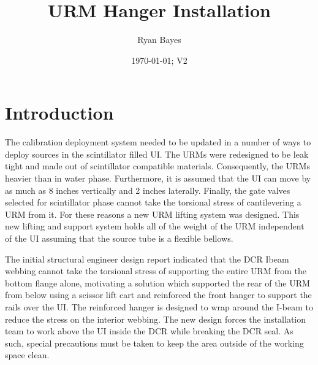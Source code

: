 \documentclass[11pt]{article}
\title{URM Hanger Installation}
\author{Ryan Bayes}
\date{\today; V2}
\begin{document}
\maketitle

\section{Introduction}
The calibration deployment system needed to be updated in a number of ways to deploy sources in the scintillator filled UI. The URMs were redesigned to be leak tight and made out of scintillator compatible materials. Consequently, the URMs heavier than in water phase. Furthermore, it is assumed that the UI can move by as much as 8 inches vertically and 2 inches laterally. Finally, the gate valves selected for scintillator phase cannot take the torsional  stress of cantilevering a URM from it. For these reasons a new URM lifting system was designed. This new lifting and support system holds all of the weight of the URM independent of the UI assuming that the source tube is a flexible bellows.

The initial structural engineer design report indicated that the DCR Ibeam webbing cannot take the torsional stress of supporting the entire URM from the bottom flange alone, motivating a solution which supported the rear of the URM from below using a scissor lift cart and reinforced the front hanger to support the rails over the UI. The reinforced hanger is designed to wrap around the I-beam to reduce the stress on the interior webbing. The new design forces the installation team to work above the UI inside the DCR while breaking the DCR seal. As such, special precautions must be taken to keep the area outside of the working space clean.
\end{document}
